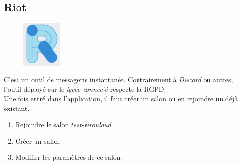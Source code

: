 \documentclass[a4paper,11pt]{article}
\begin{document}
\begin{Form}
\subsection{Riot}
\begin{figure}[!h]
\centering
\includegraphics[width=2cm]{ressources/riot.png}
\label{riot}
\end{figure}
C'est un outil de messagerie instantanée. Contrairement à \emph{Discord} ou autres, l'outil déployé sur le \emph{lycée connecté} respecte la RGPD.\\
Une fois entré dans l'application, il faut créer un salon ou en rejoindre un déjà existant.
\begin{activite}
\begin{enumerate}
\item Rejoindre le salon \emph{test-viroulaud}.
\item Créer un salon.
\item Modifier les paramètres de ce salon.
\end{enumerate}
\end{activite}
\end{Form}
\end{document}
